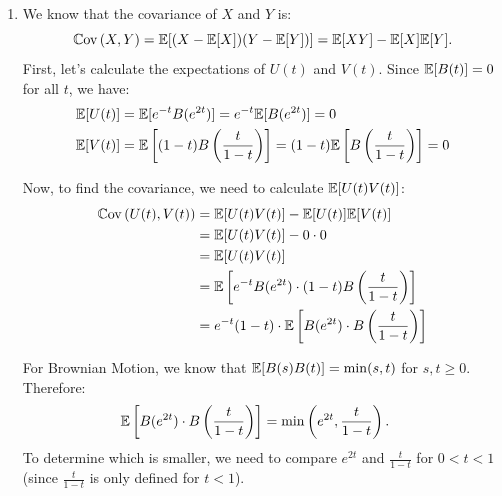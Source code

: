 \documentclass[12pt]{article}
\begin{document}
\begin{enumerate}
		Now, using the formula for the expectation of a product:
		\begin{align*}
			\ev[B(u)B(u+v)\mid B(u+v+w) = z]
			&= \cov\bigl(B(u), B(u+v)\mid B(u+v+w) = z\bigr)\\
			&\quad {}+ \ev[B(u)\mid B(u+v+w) = z] 
			\;\;\;\;\;\;
			\ev[B(u+v)\mid B(u+v+w) = z]
			\\
			&= \frac{uw}{u+v+w}
			\;+\; \frac{u}{u+v+w}\,z\,\frac{u+v}{u+v+w}\,z
			\\
			&= \frac{uw}{u+v+w}
			\;+\; \frac{u(u+v)}{(u+v+w)^2}\,z^2.
		\end{align*}
		
		
		Therefore:
		\begin{equation*}
			\ev[B(u)B(u+v)|B(u+v+w)] = \frac{uw}{u+v+w} + \frac{u(u+v)}{(u+v+w)^2} \cdot B(u+v+w)^2
		\end{equation*}
		\item We know that the covariance of $X$ and $Y$ is:
		\begin{equation*}
			\mathbb{C}\mathrm{ov}\,(X, Y) = \mathbb{E}[(X - \mathbb{E}[X])(Y - \mathbb{E}[Y])] = \mathbb{E}[XY] - \mathbb{E}[X]\mathbb{E}[Y].
		\end{equation*}
		First, let's calculate the expectations of $U(t)$ and $V(t)$. Since $\mathbb{E}[B(t)] = 0$ for all $t$, we have:
		\begin{align*}
			\mathbb{E}[U(t)] &= \mathbb{E}[e^{-t}B(e^{2t})] = e^{-t}\mathbb{E}[B(e^{2t})] = 0 \\
			\mathbb{E}[V(t)] &= \mathbb{E}\left[(1-t)B\left(\frac{t}{1-t}\right)\right] = (1-t)\mathbb{E}\left[B\left(\frac{t}{1-t}\right)\right] = 0
		\end{align*}
		
		Now, to find the covariance, we need to calculate $\mathbb{E}[U(t)V(t)]$:
		\begin{align*}
			\mathbb{C}\mathrm{ov}\,(U(t), V(t)) &= \mathbb{E}[U(t)V(t)] - \mathbb{E}[U(t)]\mathbb{E}[V(t)] \\
			&= \mathbb{E}[U(t)V(t)] - 0 \cdot 0 \\
			&= \mathbb{E}[U(t)V(t)] \\
			&= \mathbb{E}\left[e^{-t}B(e^{2t}) \cdot (1-t)B\left(\frac{t}{1-t}\right)\right] \\
			&= e^{-t}(1-t) \cdot \mathbb{E}\left[B(e^{2t}) \cdot B\left(\frac{t}{1-t}\right)\right]
		\end{align*}
		
		For Brownian Motion, we know that $\mathbb{E}[B(s)B(t)] = \min(s, t)$ for $s, t \geq 0$. Therefore:
		\begin{align*}
			\mathbb{E}\left[B(e^{2t}) \cdot B\left(\frac{t}{1-t}\right)\right] &= \min\left(e^{2t}, \frac{t}{1-t}\right).
		\end{align*}
		To determine which is smaller, we need to compare $e^{2t}$ and $\frac{t}{1-t}$ for $0 < t < 1$ (since $\frac{t}{1-t}$ is only defined for $t < 1$).
		

\end{enumerate}
\end{document}
